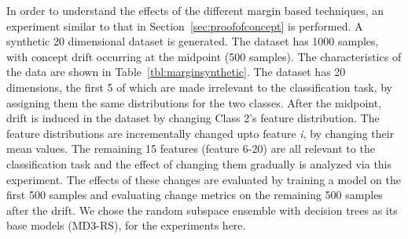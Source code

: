 \documentclass[authoryear,3p,times,twocolumn]{elsarticle}
\begin{document}
In order to understand the effects of the different margin based techniques, an experiment similar to that in Section~\ref{sec:proofofconcept} is performed. A synthetic 20 dimensional dataset is generated. The dataset has 1000 samples, with concept drift occurring at the midpoint (500 samples). The characteristics of the data are shown in Table~\ref{tbl:marginsynthetic}. The dataset has 20 dimensions, the first 5 of which are made irrelevant to the classification task, by assigning them the same distributions for the two classes. After the midpoint, drift is induced in the dataset by changing Class 2's feature distribution. The feature distributions are incrementally changed upto feature \textit{i}, by changing their mean values. The remaining 15 features (feature 6-20) are all relevant to the classification task and the effect of changing them gradually is analyzed via this experiment. The effects of these changes are evaluated by training a model on the first 500 samples and evaluating change metrics on the remaining 500 samples after the drift. We chose the random subspace ensemble with decision trees as its base models (MD3-RS), for the experiments here. 
\end{document}
